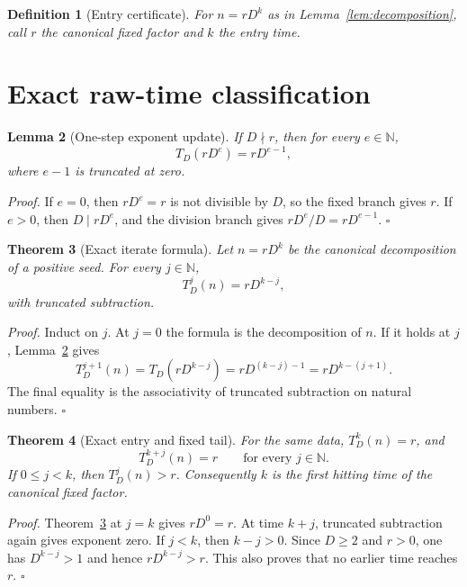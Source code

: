 \documentclass[11pt,letterpaper]{article}
\newcommand{\N}{\mathbb{N}}
\newtheorem{theorem}{Theorem}
\newtheorem{lemma}[theorem]{Lemma}
\newtheorem{definition}[theorem]{Definition}
\newenvironment{proof}{\noindent\textit{Proof.}}{\hfill\(\square\)}
\begin{document}
\begin{definition}[Entry certificate]
For $n=rD^k$ as in Lemma~\ref{lem:decomposition}, call $r$ the
\emph{canonical fixed factor} and $k$ the \emph{entry time}.
\end{definition}

\section{Exact raw-time classification}

\begin{lemma}[One-step exponent update]
\label{lem:one-step}
If $D\nmid r$, then for every $e\in\N$,
\[
 T_D(rD^e)=rD^{e-1},
\]
where $e-1$ is truncated at zero.
\end{lemma}

\begin{proof}
If $e=0$, then $rD^e=r$ is not divisible by $D$, so the fixed branch gives
$r$.  If $e>0$, then $D\mid rD^e$, and the division branch gives
$rD^e/D=rD^{e-1}$.
\end{proof}

\begin{theorem}[Exact iterate formula]
\label{thm:iterate}
Let $n=rD^k$ be the canonical decomposition of a positive seed.  For every
$j\in\N$,
\[
 T_D^j(n)=rD^{k-j},
\]
with truncated subtraction.
\end{theorem}

\begin{proof}
Induct on $j$.  At $j=0$ the formula is the decomposition of $n$.  If it
holds at $j$, Lemma~\ref{lem:one-step} gives
\[
 T_D^{j+1}(n)=T_D(rD^{k-j})=rD^{(k-j)-1}=rD^{k-(j+1)}.
\]
The final equality is the associativity of truncated subtraction on natural
numbers.
\end{proof}

\begin{theorem}[Exact entry and fixed tail]
\label{thm:entry}
For the same data, $T_D^k(n)=r$, and
\[
 T_D^{k+j}(n)=r
 \qquad\text{for every }j\in\N.
\]
If $0\leq j<k$, then $T_D^j(n)>r$.  Consequently $k$ is the first hitting
time of the canonical fixed factor.
\end{theorem}

\begin{proof}
Theorem~\ref{thm:iterate} at $j=k$ gives $rD^0=r$.  At time $k+j$, truncated
subtraction again gives exponent zero.  If $j<k$, then $k-j>0$.  Since
$D\geq2$ and $r>0$, one has $D^{k-j}>1$ and hence
$rD^{k-j}>r$.  This also proves that no earlier time reaches $r$.
\end{proof}
\end{document}
